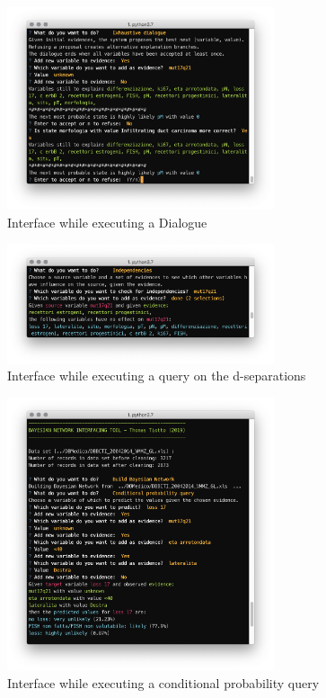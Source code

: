 \begin{figure}[htbp]
\centerline{\includegraphics[width=0.7\textwidth]{methodology/images/nl-dialogue}}
\caption{Interface while executing a Dialogue}
\label{fig:nl-dialogue}
\end{figure}

\begin{figure}[htbp]
\centerline{\includegraphics[width=0.7\textwidth]{methodology/images/nl-independencies-query}}
\caption{Interface while executing a query on the d-separations}
\label{fig:nl-independencies}
\end{figure}

\begin{figure}[htbp]
\centerline{\includegraphics[width=0.7\textwidth]{methodology/images/nl-conditional-query}}
\caption{Interface while executing a conditional probability query}
\label{fig:nl-conditional}
\end{figure}

